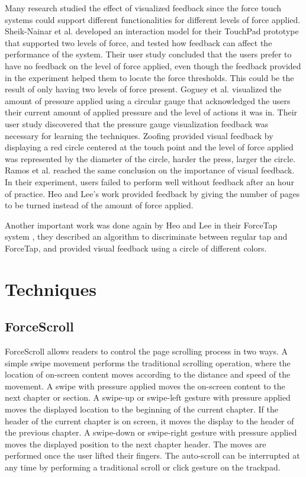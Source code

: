 \documentclass{sigchi}
\begin{document}
Many research studied the effect of visualized feedback since the force touch systems could support different functionalities for different levels of force applied. Sheik-Nainar et al. \cite{sheik2013two} developed an interaction model for their TouchPad prototype that supported two levels of force, and tested how feedback can affect the performance of the system. Their user study concluded that the users prefer to have no feedback on the level of force applied, even though the feedback provided in the experiment helped them to locate the force thresholds. This could be the result of only having two levels of force present. Goguey et al. \cite{goguey2018improving} visualized the amount of pressure applied using a circular gauge that acknowledged the users their current amount of applied pressure and the level of actions it was in. Their user study discovered that the pressure gauge visualization feedback was necessary for learning the techniques. Zoofing \cite{quinn2009zoofing} provided visual feedback by displaying a red circle centered at the touch point and the level of force applied was represented by the diameter of the circle, harder the press, larger the circle. Ramos et al. \cite{ramos2004pressure} reached the same conclusion on the importance of visual feedback. In their experiment, users failed to perform well without feedback after an hour of practice. Heo and Lee's work \cite{heo2011force} provided feedback by giving the number of pages to be turned instead of the amount of force applied. 

Another important work was done again by Heo and Lee in their ForceTap system \cite{heo2011forcetap}, they described an algorithm to discriminate between regular tap and ForceTap, and provided visual feedback using a circle of different colors.    

\section{Techniques}
\subsection{ForceScroll}
ForceScroll allows readers to control the page scrolling process in two ways. A simple swipe movement performs the traditional scrolling operation, where the location of on-screen content moves according to the distance and speed of the movement. A swipe with pressure applied moves the on-screen content to the next chapter or section. A swipe-up or swipe-left gesture with pressure applied moves the displayed location to the beginning of the current chapter. If the header of the current chapter is on screen, it moves the display to the header of the previous chapter. A swipe-down or swipe-right gesture with pressure applied moves the displayed position to the next chapter header. The moves are performed once the user lifted their fingers. The auto-scroll can be interrupted at any time by performing a traditional scroll or click gesture on the trackpad.
\end{document}
